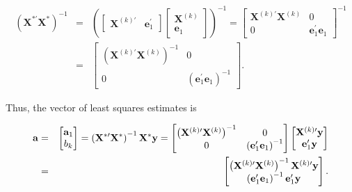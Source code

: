 \begin{center}
\begin{eqnarray*}
\left( \mathbf{X}^{\ast \prime }\mathbf{X}^{\ast }\right) ^{-1}
&=&\left(
\begin{bmatrix}
\mathbf{X}^{(k)\prime } & \mathbf{e}_1^{\prime}%
\end{bmatrix}%
\begin{bmatrix}
\mathbf{X}^{(k)} \\
\mathbf{e}_1%
\end{bmatrix}%
\right) ^{-1}=%
\begin{bmatrix}
\mathbf{X}^{(k)\prime }\mathbf{X}^{(k)} & 0 \\
0 & \mathbf{e}_1^{\prime}\mathbf{e}_1%
\end{bmatrix}%
^{-1} \\
&=&%
\begin{bmatrix}\label{E5:OVXPX}
\left( \mathbf{X}^{(k)\prime }\mathbf{X}^{(k)}\right) ^{-1} & 0 \\
0 & \left( \mathbf{e}_1^{\prime}\mathbf{e}_1\right) ^{-1}%
\end{bmatrix}.
\end{eqnarray*}
\end{center}

Thus, the vector of least squares estimates is

\begin{center}
\begin{eqnarray} \label{E5:OVLSEstimates}
\mathbf{a} &=&%
\begin{bmatrix} \notag
\mathbf{a}_1 \\
b_{k}%
\end{bmatrix}
=\left( \mathbf{X}^{\ast \prime }\mathbf{X}^{\ast }\right) ^{-1}\mathbf{X}%
^{\ast }\mathbf{y}=%
\begin{bmatrix} \notag
\left( \mathbf{X}^{(k)\prime }\mathbf{X}^{(k)}\right) ^{-1} & 0 \\
0 & \left( \mathbf{e}_1^{\prime}\mathbf{e}_1\right) ^{-1}%
\end{bmatrix}%
\begin{bmatrix} \notag
\mathbf{X}^{(k)\prime }\mathbf{y} \\
\mathbf{e}_1^{\prime}\mathbf{y}%
\end{bmatrix}
\\
&=&%
\begin{bmatrix}
\left( \mathbf{X}^{(k)\prime }\mathbf{X}^{(k)}\right) ^{-1}\mathbf{X}%
^{(k)\prime }\mathbf{y} \\
\left( \mathbf{e}_1^{\prime}\mathbf{e}_1\right) ^{-1}%
\mathbf{e}_1^{\prime}\mathbf{y}%
\end{bmatrix}.
\end{eqnarray}
\end{center}

